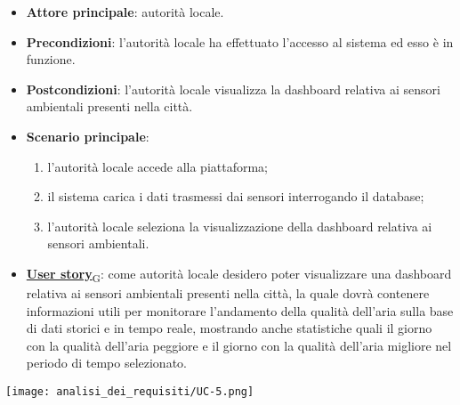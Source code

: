 \begin{itemize}
	\item \textbf{Attore principale}: autorità locale.
	\item \textbf{Precondizioni}: l'autorità locale ha effettuato l'accesso al sistema ed esso è in funzione.
	\item \textbf{Postcondizioni}: l'autorità locale visualizza la dashboard relativa
	      ai sensori ambientali presenti nella città.
	\item \textbf{Scenario principale}:
	      \begin{enumerate}
		      \item l'autorità locale accede alla piattaforma;
		      \item il sistema carica i dati trasmessi dai sensori interrogando il database;
		      \item l'autorità locale seleziona la visualizzazione della dashboard relativa ai sensori ambientali.
	      \end{enumerate}
	\item \href{https://7last.github.io/docs/rtb/documentazione-interna/glossario\#user-story}{\textbf{User story}\textsubscript{G}}:
	      come autorità locale desidero poter visualizzare una dashboard relativa ai sensori ambientali presenti nella città, la quale
	      dovrà contenere informazioni utili per monitorare l'andamento della qualità dell'aria sulla base di dati storici e in tempo reale, mostrando
	      anche statistiche quali il giorno con la qualità dell'aria peggiore e il giorno con la qualità dell'aria migliore nel periodo di tempo selezionato.
\end{itemize}
\begin{center}
	\texttt{[image: analisi\_dei\_requisiti/UC-5.png]}
\end{center}


